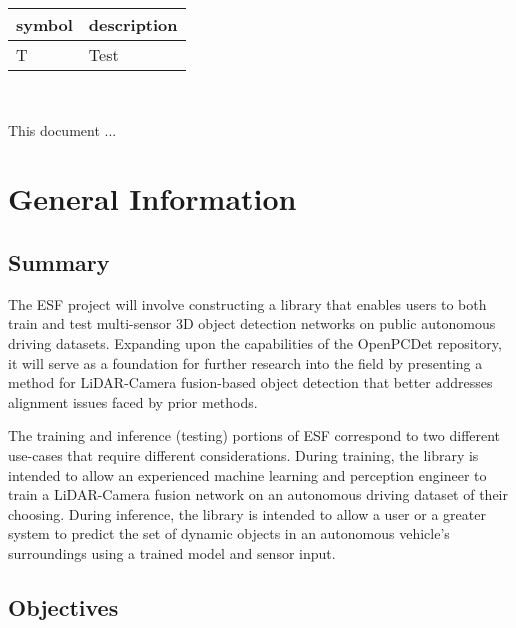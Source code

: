 \documentclass[12pt, titlepage]{article}
\newcommand{\ProjectName}{ESF }
\begin{document}
\renewcommand{\arraystretch}{1.2}
\begin{tabular}{l l} 
  \toprule		
  \textbf{symbol} & \textbf{description}\\
  \midrule 
  T & Test\\
  \bottomrule
\end{tabular}\\



\newpage


This document ... 

\section{General Information}

\subsection{Summary}

The \ProjectName{}project will involve constructing a library that enables users to both
train and test multi-sensor 3D object detection networks on public autonomous driving datasets. 
Expanding upon the capabilities of the OpenPCDet repository, it will serve as a foundation for 
further research into the field by presenting a method for LiDAR-Camera fusion-based object 
detection that better addresses alignment issues faced by prior methods. 

The training and inference (testing) portions of \ProjectName{}correspond to two different use-cases 
that require different considerations. During training, the library is intended to allow an experienced
machine learning and perception engineer to train a LiDAR-Camera fusion network on an autonomous driving 
dataset of their choosing. During inference, the library is intended to allow a user or a greater system 
to predict the set of dynamic objects in an autonomous vehicle's surroundings using a trained model and 
sensor input.

\subsection{Objectives}
\end{document}
